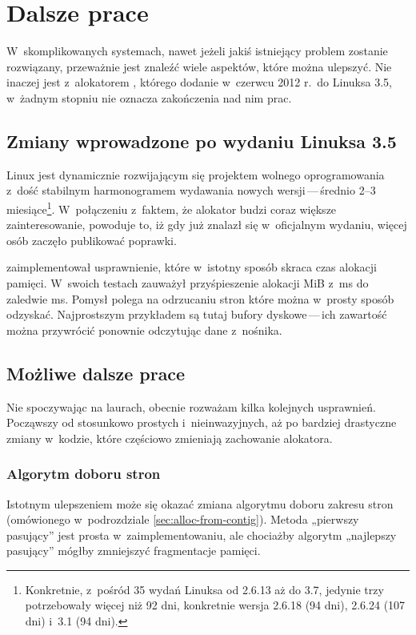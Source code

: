 \chapter{Dalsze prace}

W~skomplikowanych systemach, nawet jeżeli jakiś istniejący problem
zostanie rozwiązany, przeważnie jest znaleźć wiele aspektów, które
można ulepszyć.  Nie inaczej jest z~alokatorem , którego dodanie
w~czerwcu 2012 r.\ do Linuksa 3.5, w~żadnym stopniu nie oznacza
zakończenia nad nim prac.

\section{Zmiany wprowadzone po wydaniu Linuksa 3.5}

Linux jest dynamicznie rozwijającym się projektem wolnego
oprogramowania z~dość stabilnym harmonogramem wydawania nowych
wersji\,---\,średnio 2--3 miesiące\footnote{Konkretnie, z~pośród 35
  wydań Linuksa od 2.6.13 aż do 3.7, jedynie trzy potrzebowały więcej
  niż 92 dni, konkretnie wersja 2.6.18 (94 dni), 2.6.24 (107 dni)
  i~3.1 (94 dni).}.  W~połączeniu z~faktem, że alokator  budzi
coraz większe zainteresowanie, powoduje to, iż gdy już znalazł się
w~oficjalnym wydaniu, więcej osób zaczęło publikować poprawki.

\textcite{patch:cma-discard} zaimplementował usprawnienie, które
w~istotny sposób skraca czas alokacji pamięci.  W~swoich testach
zauważył przyśpieszenie alokacji \unit[10]{MiB} z~\unit[146]{ms} do
zaledwie \unit[7]{ms}.  Pomysł polega na odrzucaniu stron które można
w~prosty sposób odzyskać.  Najprostszym przykładem są tutaj bufory
dyskowe\,---\,ich zawartość można przywrócić ponownie odczytując dane
z~nośnika.

\section{Możliwe dalsze prace}

Nie spoczywając na laurach, obecnie rozważam kilka kolejnych
usprawnień.  Począwszy od stosunkowo prostych i~nieinwazyjnych, aż po
bardziej drastyczne zmiany w~kodzie, które częściowo zmieniają
zachowanie alokatora.

\subsection{Algorytm doboru stron}

Istotnym ulepszeniem może się okazać zmiana algorytmu doboru zakresu
stron (omówionego w~podrozdziale \ref{sec:alloc-from-contig}).  Metoda
„pierwszy pasujący” jest prosta w~zaimplementowaniu, ale chociażby
algorytm „najlepszy pasujący” mógłby zmniejszyć fragmentacje pamięci.

